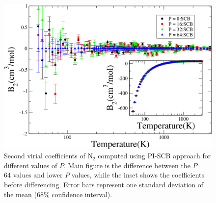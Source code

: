             \begin{figure}[!htbp]
                \centering
                \includegraphics[scale=0.20,keepaspectratio]{Chapter-5/Figures/B2N2AllSCBDiff.png}
                \caption{Second virial coefficients of N$_2$ computed using PI-SCB approach for different values of $P$. Main figure is the difference between the $P$ = 64 values and lower $P$ values, while the inset shows the coefficients before differencing. Error bars represent one standard deviation of the mean (68\% confidence interval).}
                \label{fig:B2N2AllSCBDiff}
            \end{figure}
        \fi


